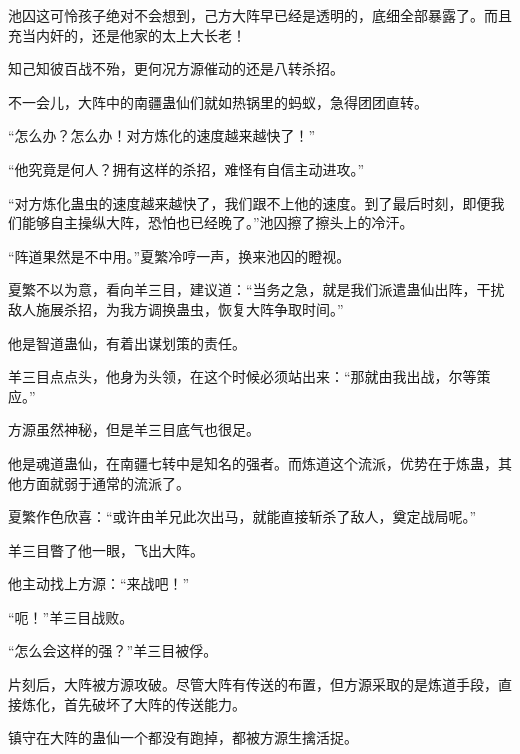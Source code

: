 \begin{this_body}
池囚这可怜孩子绝对不会想到，己方大阵早已经是透明的，底细全部暴露了。而且充当内奸的，还是他家的太上大长老！

知己知彼百战不殆，更何况方源催动的还是八转杀招。

不一会儿，大阵中的南疆蛊仙们就如热锅里的蚂蚁，急得团团直转。

“怎么办？怎么办！对方炼化的速度越来越快了！”

“他究竟是何人？拥有这样的杀招，难怪有自信主动进攻。”

“对方炼化蛊虫的速度越来越快了，我们跟不上他的速度。到了最后时刻，即便我们能够自主操纵大阵，恐怕也已经晚了。”池囚擦了擦头上的冷汗。

“阵道果然是不中用。”夏繁冷哼一声，换来池囚的瞪视。

夏繁不以为意，看向羊三目，建议道：“当务之急，就是我们派遣蛊仙出阵，干扰敌人施展杀招，为我方调换蛊虫，恢复大阵争取时间。”

他是智道蛊仙，有着出谋划策的责任。

羊三目点点头，他身为头领，在这个时候必须站出来：“那就由我出战，尔等策应。”

方源虽然神秘，但是羊三目底气也很足。

他是魂道蛊仙，在南疆七转中是知名的强者。而炼道这个流派，优势在于炼蛊，其他方面就弱于通常的流派了。

夏繁作色欣喜：“或许由羊兄此次出马，就能直接斩杀了敌人，奠定战局呢。”

羊三目瞥了他一眼，飞出大阵。

他主动找上方源：“来战吧！”

“呃！”羊三目战败。

“怎么会这样的强？”羊三目被俘。

片刻后，大阵被方源攻破。尽管大阵有传送的布置，但方源采取的是炼道手段，直接炼化，首先破坏了大阵的传送能力。

镇守在大阵的蛊仙一个都没有跑掉，都被方源生擒活捉。

\end{this_body}

